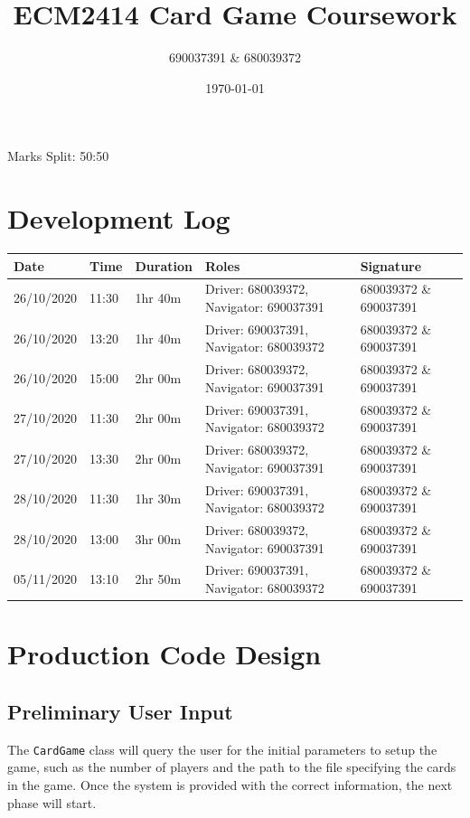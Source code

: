 \documentclass[a4paper, 11pt] {article}
\begin{document}
\title{ECM2414 Card Game Coursework}
\author{690037391 \& 680039372}
\date{\today}
\maketitle
	\begin{center}
		Marks Split: 50:50
	\end{center}
\pagebreak
\section*{Development Log}
\begin{center}
\begin{table}[H]
\begin{tabular}{|l|l|l|l|l|}
\hline
Date           & Time     & Duration  & Roles                                                 & Signature                       \\ \hline
 26/10/2020 & 11:30    & 1hr 40m  & Driver: 680039372, Navigator: 690037391 & 680039372 \& 690037391 \\ \hline
 26/10/2020 & 13:20    & 1hr 40m  & Driver: 690037391, Navigator: 680039372 & 680039372 \& 690037391 \\ \hline
 26/10/2020 & 15:00    & 2hr 00m & Driver: 680039372, Navigator: 690037391 & 680039372 \& 690037391 \\ \hline
 27/10/2020 & 11:30    & 2hr 00m & Driver: 690037391, Navigator: 680039372 & 680039372 \& 690037391 \\ \hline
 27/10/2020 & 13:30 & 2hr 00m & Driver: 680039372, Navigator: 690037391 & 680039372 \& 690037391 \\ \hline
 28/10/2020 & 11:30 & 1hr 30m & Driver: 690037391, Navigator: 680039372 & 680039372 \& 690037391 \\ \hline
 28/10/2020 & 13:00 & 3hr 00m & Driver: 680039372, Navigator: 690037391 & 680039372 \& 690037391 \\ \hline
 05/11/2020 & 13:10 & 2hr 50m & Driver: 690037391, Navigator: 680039372 & 680039372 \& 690037391 \\ \hline
\end{tabular}
\end{table}
\end{center}
\FloatBarrier
\pagebreak
\section*{Production Code Design}
\subsection*{Preliminary User Input}
The \texttt{CardGame} class will query the user for the initial parameters to setup the game, such as the number of players and the path to the file specifying the cards in the game. Once the system is provided with the correct information, the next phase will start.
\end{document}
